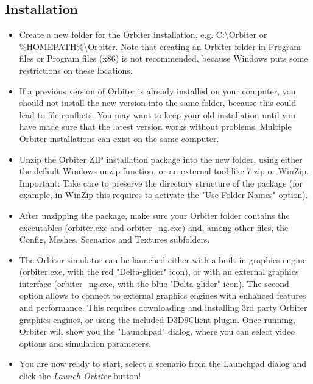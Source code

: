\documentclass[Orbiter User Manual.tex]{subfiles}
\begin{document}
\subsection{Installation}

\begin{itemize}
	\item Create a new folder for the Orbiter installation, e.g.
		C:\textbackslash Orbiter or \%HOMEPATH\%\textbackslash Orbiter. Note
		that creating an Orbiter folder in Program files or Program files (x86)
		is not recommended, because Windows puts some restrictions on these
		locations.
	\item If a previous version of Orbiter is already installed on your
		computer, you should not install the new version into the same folder,
		because this could lead to file conflicts. You may want to keep your old
		installation until you have made sure that the latest version works
		without problems. Multiple Orbiter installations can exist on the same
		computer.
	\item Unzip the Orbiter ZIP installation package into the new folder, using
		either the default Windows unzip function, or an external tool like
		7-zip or WinZip. Important: Take care to preserve the directory
		structure of the package (for example, in WinZip this requires to
		activate the "Use Folder Names" option).
	\item After unzipping the package, make sure your Orbiter folder contains
		the executables (orbiter.exe and orbiter\_ng.exe) and, among other
		files, the Config, Meshes, Scenarios and Textures subfolders.


	\item The Orbiter simulator can be launched either with a built-in graphics
		engine (orbiter.exe, with the red "Delta-glider" icon), or with an
		external graphics interface (orbiter\_ng.exe, with the blue
		"Delta-glider" icon). The second option allows to connect to external
		graphics engines with enhanced features and performance. This requires
		downloading and installing 3rd party Orbiter graphics engines, or using
		the included D3D9Client plugin. Once running, Orbiter will show you the
		"Launchpad" dialog, where you can select video options and simulation
		parameters.
	\item You are now ready to start, select a scenario from the Launchpad
		dialog and click the \emph{Launch Orbiter} button!
\end{itemize}
\end{document}
